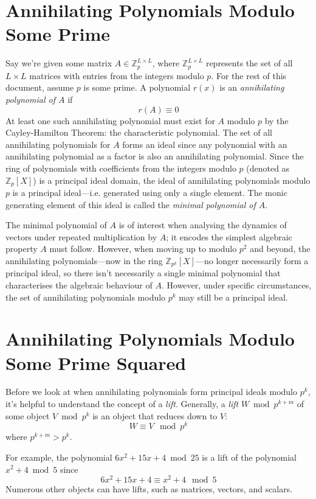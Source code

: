 \documentclass[a4paper, 12pt, reqno]{amsart}
\begin{document}
	\section{Annihilating Polynomials Modulo Some Prime}
		Say we're given some matrix $A \in \mathds{Z}_{p}^{L \times L}$, where $\mathds{Z}_{p}^{L \times L}$ represents the set of all $L \times L$ matrices with entries
		from the integers modulo $p$. For the rest of this document, assume $p$ is some prime. A polynomial $r(x)$ is an \emph{annihilating polynomial of $A$} if
		\[
			r(A) \equiv 0
		\]
		At least one such annihilating polynomial must exist for $A$ modulo $p$ by the Cayley-Hamilton Theorem: the characteristic polynomial. The set of all annihilating
		polynomials for $A$ forms an ideal since any polynomial with an annihilating polynomial as a factor is also an annihilating polynomial. Since the ring of
		polynomials with coefficients from the integers modulo $p$ (denoted as $\mathds{Z}_{p}[X]$) is a principal ideal domain, the ideal of annihilating polynomials
		modulo $p$ is a principal ideal---i.e. generated using only a single element. The monic generating element of this ideal is called the \emph{minimal polynomial of
		$A$}.
		
		The minimal polynomial of $A$ is of interest when analysing the dynamics of vectors under repeated multiplication by $A$; it encodes the simplest algebraic
		property $A$ must follow. However, when moving up to modulo $p^2$ and beyond, the annihilating polynomials---now in the ring $\mathds{Z}_{p^k}[X]$---no longer 
		necessarily form a principal ideal, so there isn't necessarily a single minimal polynomial that characterises the algebraic behaviour of $A$. However, under 
		specific circumstances, the set of annihilating polynomials modulo $p^k$ may still be a principal ideal.
		
	\section{Annihilating Polynomials Modulo Some Prime Squared}
		Before we look at when annihilating polynomials form principal ideals modulo $p^k$, it's helpful to understand the concept of a \emph{lift}. Generally, a \emph{lift}
		$W \bmod{p^{k+m}}$ of some object $V \bmod{p^k}$ is an object that reduces down to $V$:
		\[
			W \equiv V \mod{p^k}
		\]
		where $p^{k+m} > p^{k}$.
		
		For example, the polynomial $6x^{2} + 15x + 4 \bmod{25}$ is a lift of the polynomial \\ $x^{2} + 4 \bmod{5}$ since
		\[
			6x^{2} + 15x + 4 \equiv x^{2} + 4 \mod{5}
		\]
		Numerous other objects can have lifts, such as matrices, vectors, and scalars.
		
\end{document}
